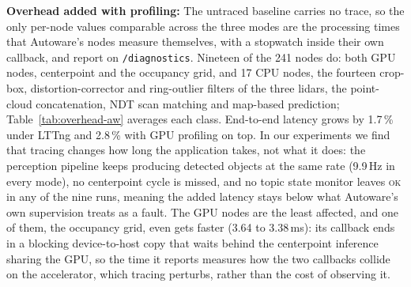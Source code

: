\noindent
\textbf{Overhead added with profiling:}
The untraced baseline carries no trace, so the only per-node values comparable
across the three modes are the processing times that Autoware's nodes measure
themselves, with a stopwatch inside their own callback, and report on
\texttt{/diagnostics}. Nineteen of the 241 nodes do: both GPU nodes, centerpoint
and the occupancy grid, and 17 CPU nodes, the fourteen crop-box,
distortion-corrector and ring-outlier filters of the three lidars, the
point-cloud concatenation, NDT scan matching and map-based prediction;
Table~\ref{tab:overhead-aw} averages each class. End-to-end latency grows by 1.7\,\%
under LTTng and 2.8\,\% with GPU profiling on top. In our experiments we find
that tracing changes how long the application takes, not what it does: the
perception pipeline keeps producing detected objects at the same rate
(9.9\,Hz in every mode), no centerpoint cycle is missed, and no topic state
monitor leaves \textsc{ok} in any of the nine runs, meaning the added latency
stays below what Autoware's own supervision treats as a fault. The GPU nodes
are the least affected, and one of them, the occupancy grid, even gets faster
(3.64 to 3.38\,ms): its callback ends in a blocking device-to-host copy that
waits behind the centerpoint inference sharing the GPU, so the time it reports
measures how the two callbacks collide on the accelerator, which tracing
perturbs, rather than the cost of observing it.

